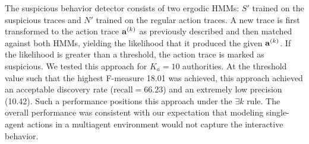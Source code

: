 {The suspicious behavior detector consists of two ergodic HMMs: $S'$ trained on the suspicious traces and $N'$ trained on the regular action traces. A new trace is first transformed to the action trace $\mathbf{a}^{\scriptsize(k)}$ as previously described and then matched against both HMMs, yielding the likelihood that it produced the given $\mathbf{a}^{\scriptsize(k)}$. If the likelihood is greater than a threshold, the action trace is marked as suspicious. 
%
%
We tested this approach for $K_a=10$ authorities. At the threshold value such that the highest F-measure 18.01 was achieved, this approach achieved an acceptable discovery rate ($\text{recall}=66.23$) and an extremely low precision (10.42). Such a performance positions this approach under the $\exists k$ rule.  The overall performance was consistent with our expectation that modeling single-agent actions in a multiagent environment would not capture the interactive behavior. 





}
